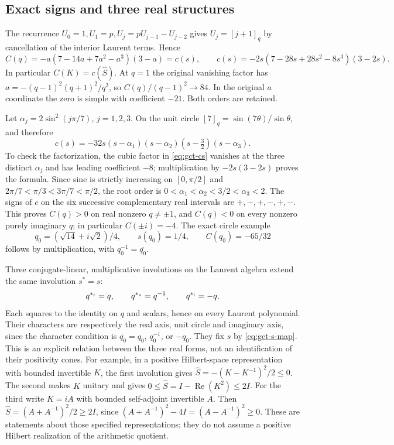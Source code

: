\subsection{Exact signs and three real structures}
The recurrence $U_0=1,U_1=p,U_j=pU_{j-1}-U_{j-2}$ gives
$U_j=[j+1]_q$ by cancellation of the interior Laurent terms. Hence
\begin{equation}\label{eq:gct-cs}
 C(q)=-a(7-14a+7a^2-a^3)(3-a)=c(s),\qquad
 c(s)=-2s(7-28s+28s^2-8s^3)(3-2s).
\end{equation}
In particular $C(K)=c(\widehat S)$. At $q=1$ the original vanishing
factor has $a=-(q-1)^2(q+1)^2/q^2$, so
$C(q)/(q-1)^2\to84$. In the original $a$ coordinate the zero is simple
with coefficient $-21$. Both orders are retained.

Let $\alpha_j=2\sin^2(j\pi/7)$, $j=1,2,3$. On the unit circle
$[7]_q=\sin(7\theta)/\sin\theta$, and therefore
\[
 c(s)=-32s(s-\alpha_1)(s-\alpha_2)(s-\tfrac32)(s-\alpha_3).
\]
To check the factorization, the cubic factor in \eqref{eq:gct-cs}
vanishes at the three distinct $\alpha_j$ and has leading coefficient
$-8$; multiplication by $-2s(3-2s)$ proves the formula. Since sine
is strictly increasing on $[0,\pi/2]$ and
$2\pi/7<\pi/3<3\pi/7<\pi/2$, the root order is
$0<\alpha_1<\alpha_2<3/2<\alpha_3<2$.
The signs of $c$ on the six successive complementary real intervals are
$+,-,+,-,+,-$. This proves $C(q)>0$ on real nonzero $q\ne\pm1$,
and $C(q)<0$ on every nonzero purely imaginary $q$; in particular
$C(\pm i)=-4$. The exact circle example
\[
 q_0=(\sqrt{14}+i\sqrt2)/4,\qquad s(q_0)=1/4,
 \qquad C(q_0)=-65/32
\]
follows by multiplication, with $q_0^{-1}=\overline{q_0}$.

Three conjugate-linear, multiplicative involutions on the Laurent
algebra extend the same involution $s^*=s$:
\[
 q^{*_{\rm r}}=q,\qquad q^{*_{\rm u}}=q^{-1},\qquad
 q^{*_{\rm i}}=-q.
\]
Each squares to the identity on $q$ and scalars, hence on every Laurent
polynomial. Their characters are respectively the real axis, unit circle
and imaginary axis, since the character condition is
$\overline{q_0}=q_0$, $q_0^{-1}$, or $-q_0$.
They fix $s$ by \eqref{eq:gct-s-map}. This is an explicit relation
between the three real forms, not an identification of their positivity
cones. For example, in a positive Hilbert-space representation with
bounded invertible $K$, the first involution gives
$\widehat S=-(K-K^{-1})^2/2\le0$. The second makes $K$ unitary and gives
$0\le\widehat S=I-\operatorname{Re}(K^2)\le2I$.
For the third write $K=iA$ with bounded self-adjoint invertible $A$.
Then $\widehat S=(A+A^{-1})^2/2\ge2I$, since
$(A+A^{-1})^2-4I=(A-A^{-1})^2\ge0$.
These are statements about those specified representations; they do
not assume a positive Hilbert realization of the arithmetic quotient.


